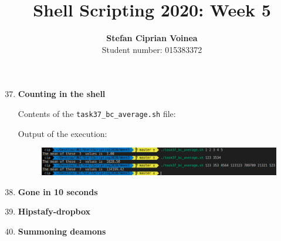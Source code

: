 \documentclass[9pt]{article}
\begin{document}
\title{Shell Scripting 2020: Week 5}
\author{\textbf{Stefan Ciprian Voinea}\\Student number: 015383372}
\maketitle


\begin{enumerate}
	
	\setcounter{enumi}{36}
	
	\item \textbf{Counting in the shell}
	
		Contents of the \texttt{task37\_bc\_average.sh} file:
	
		Output of the execution:
		\begin{figure}[h!]
			\centering
			\includegraphics[width=\linewidth]{img/task37.png}
		\end{figure}
		
	
	\item \textbf{Gone in 10 seconds}
	
	\item \textbf{Hipstafy-dropbox}
	
	\item \textbf{Summoning deamons}
	

\end{enumerate}
\end{document}

